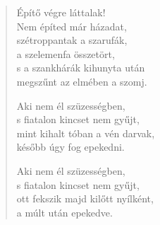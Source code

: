 \begin{verse}
 Építő végre láttalak!\\
Nem építed már házadat,\\
szétroppantak a szarufák,\\
a szelemenfa összetört,\\
s a szankhárák kihunyta után\\
megszűnt az elmében a szomj.

\newpage

 Aki nem él szüzességben,\\
s fiatalon kincset nem gyűjt,\\
mint kihalt tóban a vén darvak,\\
később úgy fog epekedni.

 Aki nem él szüzességben,\\
s fiatalon kincset nem gyűjt,\\
ott fekszik majd kilőtt nyílként,\\
a múlt után epekedve.

\end{verse}
